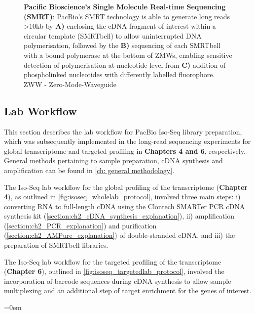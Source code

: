 \begin{figure}[!h]
	\captionsetup{width=0.95\textwidth}
	\caption[Pacific Bioscience's Single Molecule Real-time Sequencing]%
	{\textbf{Pacific Bioscience's Single Molecule Real-time Sequencing (SMRT)}: PacBio's SMRT technology is able to generate long reads >10kb by \textbf{A)} enclosing the cDNA fragment of interest within a circular template (SMRTbell) to allow uninterrupted DNA polymerisation,  followed by the \textbf{B)} sequencing of each SMRTbell with a bound polymerase at the bottom of ZMWs, enabling sensitive detection of polymerisation at nucleotide level from \textbf{C)} addition of phospholinked nucleotides with differently labelled fluorophore. ZWW - Zero-Mode-Waveguide}
	\label{fig:Mechanism}
\end{figure}

\newpage
\subsection{Lab Workflow}
\label{chap:isoseq_labpipeline}
This section describes the lab workflow for PacBio Iso-Seq library preparation, which was subsequently implemented in the long-read sequencing experiments for global transcriptome and targeted profiling in \textbf{Chapters 4 and 6}, respectively. General methods pertaining to sample preparation, cDNA synthesis and amplification can be found in \cref{ch: general methodology}.

The Iso-Seq lab workflow for the global profiling of the transcriptome (\textbf{Chapter 4}), as outlined in \cref{fig:isoseq_wholelab_protocol}, involved three main steps: i) converting RNA to full-length cDNA using the Clontech SMARTer PCR cDNA synthesis kit (\cref{section:ch2_cDNA_synthesis_explanation}), ii) amplification (\cref{section:ch2_PCR_explanation}) and purification (\cref{section:ch2_AMPure_explanation}) of double-stranded cDNA, and iii) the preparation of SMRTbell libraries. 

The Iso-Seq lab workflow for the targeted profiling of the transcriptome (\textbf{Chapter 6}), outlined in \cref{fig:isoseq_targetedlab_protocol}, involved the incorporation of barcode sequences during cDNA synthesis to allow sample multiplexing and an additional step of target enrichment for the genes of interest.

\vspace{3cm}
\begingroup
\parindent=0em
\localtableofcontents 
\endgroup

